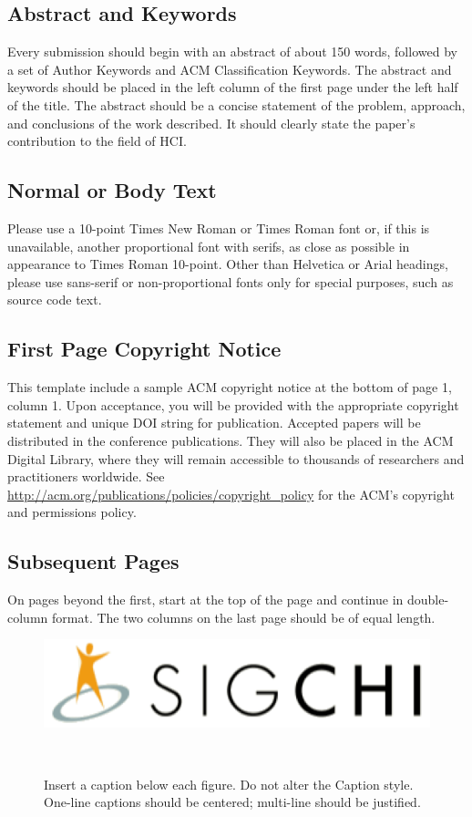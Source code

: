 \documentclass{sigchi}
\begin{document}
\subsection{Abstract and Keywords}

Every submission should begin with an abstract of about 150 words,
followed by a set of Author Keywords and ACM Classification
Keywords. The abstract and keywords should be placed in the left
column of the first page under the left half of the title. The
abstract should be a concise statement of the problem, approach, and
conclusions of the work described. It should clearly state the paper's
contribution to the field of HCI\@.

\subsection{Normal or Body Text}

Please use a 10-point Times New Roman or Times Roman font or, if this
is unavailable, another proportional font with serifs, as close as
possible in appearance to Times Roman 10-point. Other than Helvetica
or Arial headings, please use sans-serif or non-proportional fonts
only for special purposes, such as source code text.

\subsection{First Page Copyright Notice}
This template include a sample ACM copyright notice at the bottom of
page 1, column 1.  Upon acceptance, you will be provided with the
appropriate copyright statement and unique DOI string for publication.
Accepted papers will be distributed in the conference
publications. They will also be placed in the ACM Digital Library,
where they will remain accessible to thousands of researchers and
practitioners worldwide. See
\url{http://acm.org/publications/policies/copyright_policy} for the
ACM's copyright and permissions policy.

\subsection{Subsequent Pages}

On pages beyond the first, start at the top of the page and continue
in double-column format.  The two columns on the last page should be
of equal length.

\begin{figure}
\centering
  \includegraphics[width=0.9\columnwidth]{figures/sigchi-logo}
  \caption{Insert a caption below each figure. Do not alter the
    Caption style.  One-line captions should be centered; multi-line
    should be justified. }~\label{fig:figure1}
\end{figure}
\end{document}
